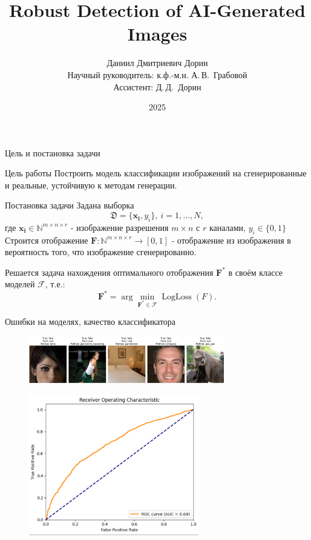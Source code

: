 \documentclass[aspectratio=169]{beamer}
\title[\hbox to 56mm{Краткое название}]{Robust Detection of AI-Generated Images}
\author[Д.\,Д.~Дорин]{Даниил Дмитриевич Дорин\\
\small Научный руководитель: к.ф.-м.н. А.\,В.~Грабовой \\
\small Ассистент: Д.\,Д.~Дорин}
\institute{Анализ данных ФПМИ МФТИ}
\date{2025}
\begin{document}
\begin{frame}
\thispagestyle{empty}
\maketitle
\end{frame}

\begin{frame}{Цель и постановка задачи}
\begin{block}{Цель работы}
    Построить модель классификации изображений на сгенерированные и реальные, устойчивую к методам генерации. 
\end{block}
\begin{block}{Постановка задачи}
Задана выборка $$\mathfrak{D} = \{\mathbf{x_i}, y_i \},\ i= 1, ..., N,$$ где $\mathbf{x_i} \in \mathbb{N}^{m \times n \times r}$ - изображение разрешения $m \times n$ с  $r$ каналами, $y_i \in \{ 0, 1\}$ \\

Строится отображение $\mathbf{F}: \mathbb{N}^{m \times n \times r} \rightarrow [0, 1] $ - отображение из изображения в вероятность того, что изображение сгенерированно.

Решается задача нахождения оптимального отображения \( \mathbf{F}^* \) в своём классе моделей \( \mathcal{F} \), т.е.:
\[
	\mathbf{F}^* = \arg\min_{\mathbf{F}^* \in \mathcal{F}} \operatorname{Log Loss}(F).
\]
\end{block}
\end{frame}
\begin{frame}{Ошибки на моделях, качество классификатора}
\begin{figure}
\centering
\includegraphics[width=0.76\textwidth]{figs/fake_images.png}
\end{figure}

\begin{figure}
\centering
\includegraphics[width=0.66\textwidth]{figs/PR_ROC.png}
\end{figure}
\end{frame}
\end{document}
